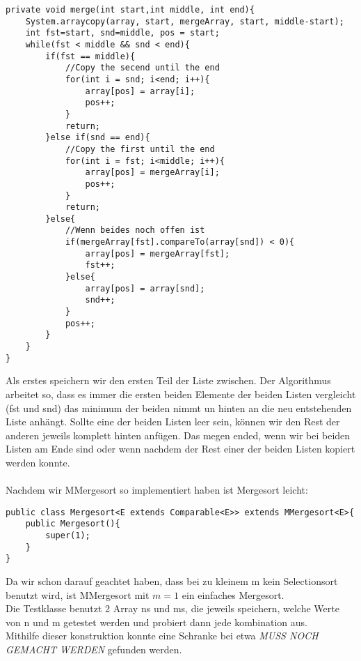 \documentclass[11pt,a4paper,ngerman]{article}
\begin{document}
\begin{lstlisting}
private void merge(int start,int middle, int end){
	System.arraycopy(array, start, mergeArray, start, middle-start);
	int fst=start, snd=middle, pos = start;
	while(fst < middle && snd < end){
		if(fst == middle){
			//Copy the secend until the end
			for(int i = snd; i<end; i++){
				array[pos] = array[i];
				pos++;
			}
			return; 
		}else if(snd == end){
			//Copy the first until the end
			for(int i = fst; i<middle; i++){
				array[pos] = mergeArray[i];
				pos++;
			}	
			return; 
		}else{
			//Wenn beides noch offen ist
			if(mergeArray[fst].compareTo(array[snd]) < 0){
				array[pos] = mergeArray[fst];
				fst++;
			}else{
				array[pos] = array[snd];
				snd++;
			}
			pos++;
		}
	}
}
\end{lstlisting}
Als erstes speichern wir den ersten Teil der Liste zwischen. Der Algorithmus arbeitet so, dass es immer die ersten beiden Elemente der beiden Listen vergleicht (fst und snd) das minimum der beiden nimmt un hinten an die neu entstehenden Liste anhängt. Sollte eine der beiden Listen leer sein, können wir den Rest der anderen jeweils komplett hinten anfügen. Das megen ended, wenn wir bei beiden Listen am Ende sind oder wenn nachdem der Rest einer der beiden Listen kopiert werden konnte.\\
\vspace{\baselineskip}\\
Nachdem wir MMergesort so implementiert haben ist Mergesort leicht:
\begin{lstlisting}
public class Mergesort<E extends Comparable<E>> extends MMergesort<E>{	
	public Mergesort(){
		super(1);
	}
}
\end{lstlisting}
Da wir schon darauf geachtet haben, dass bei zu kleinem m kein Selectionsort benutzt wird, ist MMergesort mit $m=1$ ein einfaches Mergesort.\\
Die Testklasse benutzt 2 Array ns und ms, die jeweils speichern, welche Werte von n und m getestet werden und probiert dann jede kombination aus.\\
Mithilfe dieser konstruktion konnte eine Schranke bei etwa \emph{MUSS NOCH GEMACHT WERDEN} gefunden werden.

\label{LastPage}
\end{document}
